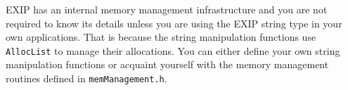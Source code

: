 EXIP has an internal memory management infrastructure and you are not required to
know its details unless you are using the EXIP string type in your own applications. That is because
the string manipulation functions use \texttt{AllocList} to manage their allocations.
You can either define your own string manipulation functions or acquaint yourself with 
the memory management routines defined in \texttt{memManagement.h}.
